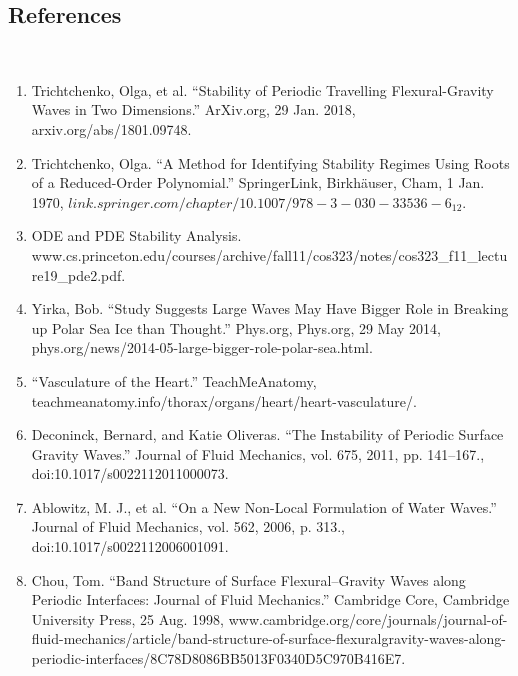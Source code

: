 \documentclass{article}
\begin{document}
\clearpage

\subsection{References}
\\
\begin{enumerate}
\item Trichtchenko, Olga, et al. “Stability of Periodic Travelling Flexural-Gravity Waves in Two Dimensions.” ArXiv.org, 29 Jan. 2018, arxiv.org/abs/1801.09748. \label{olga1} \\

\item Trichtchenko, Olga. “A Method for Identifying Stability Regimes Using Roots of a Reduced-Order Polynomial.” SpringerLink, Birkhäuser, Cham, 1 Jan. 1970, \(link.springer.com/chapter/10.1007/978-3-030-33536-6_12\).\label{reduced}\\

\item ODE and PDE Stability Analysis. www.cs.princeton.edu/courses/archive/fall11/cos323/notes/cos323_f11_lecture19_pde2.pdf. \label{stabilitypde}

\item Yirka, Bob. “Study Suggests Large Waves May Have Bigger Role in Breaking up Polar Sea Ice than Thought.” Phys.org, Phys.org, 29 May 2014, phys.org/news/2014-05-large-bigger-role-polar-sea.html. \label{icewavespic}

\item “Vasculature of the Heart.” TeachMeAnatomy, teachmeanatomy.info/thorax/organs/heart/heart-vasculature/.  \label{heart}

\item Deconinck, Bernard, and Katie Oliveras. “The Instability of Periodic Surface Gravity Waves.” Journal of Fluid Mechanics, vol. 675, 2011, pp. 141–167., doi:10.1017/s0022112011000073. \label{katie}

\item Ablowitz, M. J., et al. “On a New Non-Local Formulation of Water Waves.” Journal of Fluid Mechanics, vol. 562, 2006, p. 313., doi:10.1017/s0022112006001091. \label{AFM}

\item \label{bandstructure} Chou, Tom. “Band Structure of Surface Flexural–Gravity Waves along Periodic Interfaces: Journal of Fluid Mechanics.” Cambridge Core, Cambridge University Press, 25 Aug. 1998, www.cambridge.org/core/journals/journal-of-fluid-mechanics/article/band-structure-of-surface-flexuralgravity-waves-along-periodic-interfaces/8C78D8086BB5013F0340D5C970B416E7. \\


\end{enumerate}
\end{document}
